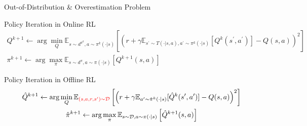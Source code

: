 \documentclass[11pt]{beamer}
\newcommand{\mbb}[1]{\mathbb{#1}}
\newcommand{\mc}[1]{\mathcal{#1}}
\begin{document}
\begin{frame}{Out-of-Distribution \& Overestimation Problem}
    \begin{block}{Policy Iteration in Online RL}
    \[
    \begin{gathered}
        Q^{k+1} \leftarrow \arg \min_Q \mbb{E}_{s \sim d^{\pi^k}, a \sim {\pi}^k(\cdot|s)}\left[ \left( r+ \gamma \mbb{E}_{s^\prime \sim T(\cdot|s,a), a^\prime \sim \pi^k(\cdot|s)}[Q^k(s^\prime, a^\prime)] - Q(s,a)\right)^2\right] \\
        \pi^{k+1} \leftarrow \arg \max_\pi \mbb{E}_{s \sim d^\pi, a \sim \pi(\cdot|s)} \left[ Q^{k+1}(s,a)\right]
    \end{gathered}
    \]
    \end{block}
    \begin{block}{Policy Iteration in Offline RL}
        \[
        \begin{gathered}
            \hat{Q}^{k+1} \leftarrow \arg \min_Q \mbb{E}_{\textcolor{red}{(s,a,r, s^\prime) \sim \mc{D}}} \left[ \left(r + \gamma \mbb{E}_{a^\prime \sim \hat{\pi}^k (\cdot|s)}  [\hat{Q}^{k}(s^\prime,a^\prime)] - Q(s,a)\right)^2 \right] \\
            \hat{\pi}^{k+1} \leftarrow \arg \max_\pi \mbb{E}_{s\sim \mc{D}, a \sim \pi(\cdot|s)} \left[ \hat{Q}^{k+1}(s,a)\right]
        \end{gathered}
        \]
    \end{block}


\end{frame}
\end{document}
